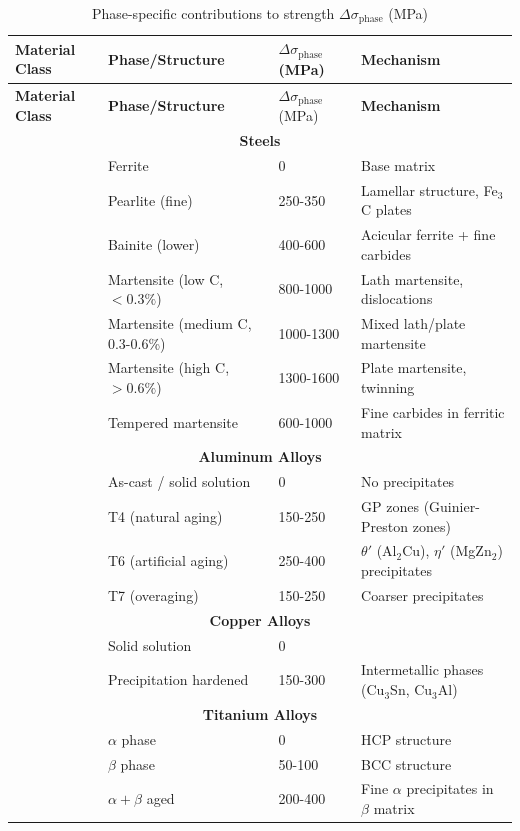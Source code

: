 \documentclass[12pt,a4paper]{article}
\begin{document}
	\begin{longtable}{p{3.5cm}p{3.0cm}p{3.0cm}p{4cm}}
		\caption{Phase-specific contributions to strength \(\Delta\sigma_{\text{phase}}\) (MPa)} \label{tab:phase-contributions} \\
		\toprule
		\textbf{Material Class} & \textbf{Phase/Structure} & \(\Delta\sigma_{\text{phase}}\) (MPa) & \textbf{Mechanism} \\
		\midrule
		\endfirsthead
		\toprule
		\textbf{Material Class} & \textbf{Phase/Structure} & \(\Delta\sigma_{\text{phase}}\) (MPa) & \textbf{Mechanism} \\
		\midrule
		\endhead
		\multicolumn{4}{c}{\textbf{Steels}} \\
		& Ferrite & 0 & Base matrix \\
		& Pearlite (fine) & 250-350 & Lamellar structure, Fe\(_3\)C plates \\
		& Bainite (lower) & 400-600 & Acicular ferrite + fine carbides \\
		& Martensite (low C, \(<0.3\%\)) & 800-1000 & Lath martensite, dislocations \\
		& Martensite (medium C, 0.3-0.6\%) & 1000-1300 & Mixed lath/plate martensite \\
		& Martensite (high C, \(>0.6\%\)) & 1300-1600 & Plate martensite, twinning \\
		& Tempered martensite & 600-1000 & Fine carbides in ferritic matrix \\
		\hline
		\multicolumn{4}{c}{\textbf{Aluminum Alloys}} \\
		& As-cast / solid solution & 0 & No precipitates \\
		& T4 (natural aging) & 150-250 & GP zones (Guinier-Preston zones) \\
		& T6 (artificial aging) & 250-400 & \(\theta'\) (Al\(_2\)Cu), \(\eta'\) (MgZn\(_2\)) precipitates \\
		& T7 (overaging) & 150-250 & Coarser precipitates \\
		\hline
		\multicolumn{4}{c}{\textbf{Copper Alloys}} \\
		& Solid solution & 0 & \\
		& Precipitation hardened & 150-300 & Intermetallic phases (Cu\(_3\)Sn, Cu\(_3\)Al) \\
		\hline
		\multicolumn{4}{c}{\textbf{Titanium Alloys}} \\
		& \(\alpha\) phase & 0 & HCP structure \\
		& \(\beta\) phase & 50-100 & BCC structure \\
		& \(\alpha+\beta\) aged & 200-400 & Fine \(\alpha\) precipitates in \(\beta\) matrix \\

\end{longtable}
\end{document}
